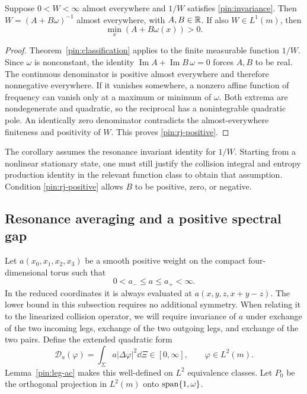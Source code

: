 \begin{corollary}
\label{pin:rj}
Suppose $0<W<\infty$ almost everywhere and $1/W$ satisfies
\eqref{pin:invariance}. Then $W=(A+B\omega)^{-1}$ almost everywhere,
with $A,B\in\mathbb R$. If also $W\in L^1(m)$, then
\begin{equation}
                         \min_x(A+B\omega(x))>0.
 \label{pin:rj-positive}
\end{equation}
\end{corollary}

\begin{proof}
Theorem~\ref{pin:classification} applies to the finite measurable
function $1/W$. Since $\omega$ is nonconstant, the identity
$\operatorname{Im}A+\operatorname{Im}B\,\omega=0$ forces $A,B$ to
be real. The continuous denominator is positive almost everywhere and
therefore nonnegative everywhere. If it vanishes somewhere, a nonzero
affine function of frequency can vanish only at a maximum or minimum
of $\omega$. Both extrema are nondegenerate and quadratic, so the
reciprocal has a nonintegrable quadratic pole. An identically zero
denominator contradicts the almost-everywhere finiteness and positivity
of $W$. This proves \eqref{pin:rj-positive}.
\end{proof}

The corollary assumes the resonance invariant identity for $1/W$.
Starting from a nonlinear stationary state, one must still justify the
collision integral and entropy production identity in the relevant
function class to obtain that assumption. Condition
\eqref{pin:rj-positive} allows $B$ to be positive, zero, or negative.

\subsection{Resonance averaging and a positive spectral gap}
\label{pin:gap}

Let $a(x_0,x_1,x_2,x_3)$ be a smooth positive weight on the compact
four-dimensional torus such that
\begin{equation}
                         0<a_-\le a\le a_+<\infty.
 \label{pin:weight}
\end{equation}
In the reduced coordinates it is always evaluated at
$a(x,y,z,x+y-z)$. The lower bound in this subsection requires no
additional symmetry. When relating it to the linearized collision
operator, we will require invariance of $a$ under exchange of the two
incoming legs, exchange of the two outgoing legs, and exchange of the
two pairs. Define the extended quadratic form
\begin{equation}
 \mathcal D_a(\varphi)
       =\int_\Sigma a|\Delta\varphi|^2\dd\Xi\in[0,\infty],
 \qquad \varphi\in L^2(m).
 \label{pin:extended-form}
\end{equation}
Lemma~\ref{pin:leg-ac} makes this well-defined on $L^2$ equivalence
classes. Let $P_0$ be the orthogonal projection in $L^2(m)$ onto
$\operatorname{span}\{1,\omega\}$.

